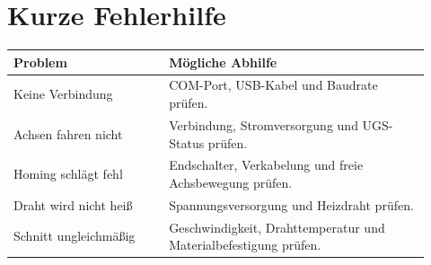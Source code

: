 \documentclass[10pt,a4paper]{article}
\begin{document}
	\section*{Kurze Fehlerhilfe}
	
	\begin{tabular}{p{0.34\linewidth} p{0.58\linewidth}}
		\textbf{Problem} & \textbf{Mögliche Abhilfe} \\
		\hline
		Keine Verbindung & COM-Port, USB-Kabel und Baudrate prüfen. \\
		Achsen fahren nicht & Verbindung, Stromversorgung und UGS-Status prüfen. \\
		Homing schlägt fehl & Endschalter, Verkabelung und freie Achsbewegung prüfen. \\
		Draht wird nicht heiß & Spannungsversorgung und Heizdraht prüfen. \\
		Schnitt ungleichmäßig & Geschwindigkeit, Drahttemperatur und Materialbefestigung prüfen. \\
	\end{tabular}
	
\end{document}
